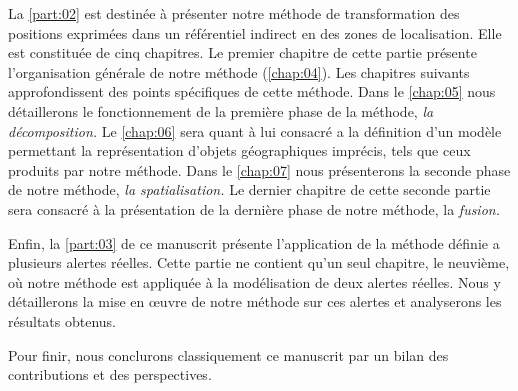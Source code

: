 La \autoref{part:02} est destinée à présenter notre méthode de
transformation des positions exprimées dans un référentiel indirect en
des zones de localisation. Elle est constituée de cinq chapitres. Le
premier chapitre de cette partie présente l’organisation générale de
notre méthode (\autoref{chap:04}). Les chapitres suivants
approfondissent des points spécifiques de cette méthode. Dans le
\autoref{chap:05} nous détaillerons le fonctionnement de la première
phase de la méthode, \emph{la décomposition.} Le \autoref{chap:06}
sera quant à lui consacré a la définition d'un modèle permettant la
représentation d'objets géographiques imprécis, tels que ceux produits
par notre méthode. Dans le \autoref{chap:07} nous présenterons la
seconde phase de notre méthode, \emph{la spatialisation.} Le dernier
chapitre de cette seconde partie sera consacré à la présentation de la
dernière phase de notre méthode, la \emph{fusion.}

Enfin, la \autoref{part:03} de ce manuscrit présente l’application de
la méthode définie a plusieurs alertes réelles. Cette partie ne
contient qu'un seul chapitre, le neuvième, où notre méthode est
appliquée à la modélisation de deux alertes réelles. Nous y
détaillerons la mise en œuvre de notre méthode sur ces alertes et
analyserons les résultats obtenus.

Pour finir, nous conclurons classiquement ce manuscrit par un bilan
des contributions et des perspectives.


